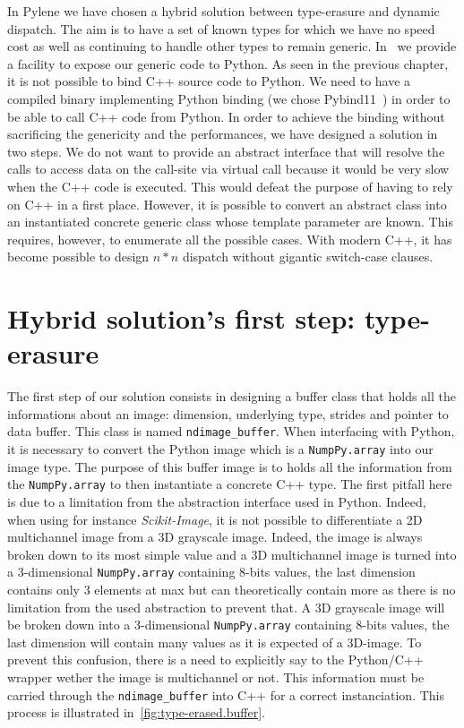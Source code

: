 In Pylene we have chosen a hybrid solution between type-erasure and dynamic dispatch. The aim is to have a set of known
types for which we have no speed cost as well as continuing to handle other types to remain generic.
In~\cite{gossec.2019.pybind} we provide a facility to expose our generic code to Python. As seen in the previous
chapter, it is not possible to bind C++ source code to Python. We need to have a compiled binary implementing Python
binding (we chose Pybind11~\parencite{jakob.2017.pybind11}) in order to be able to call C++ code from Python. In order
to achieve the binding without sacrificing the genericity and the performances, we have designed a solution in two
steps. We do not want to provide an abstract interface that will resolve the calls to access data on the call-site via
virtual call because it would be very slow when the C++ code is executed. This would defeat the purpose of having to
rely on C++ in a first place. However, it is possible to convert an abstract class into an instantiated concrete generic
class whose template parameter are known. This requires, however, to enumerate all the possible cases. With modern C++,
it has become possible to design $n*n$ dispatch without gigantic switch-case clauses.


\section{Hybrid solution's first step: type-erasure}

The first step of our solution consists in designing a buffer class that holds all the informations about an image:
dimension, underlying type, strides and pointer to data buffer. This class is named \texttt{ndimage\_buffer}. When
interfacing with Python, it is necessary to convert the Python image which is a \texttt{NumpPy.array} into our image
type. The purpose of this buffer image is to holds all the information from the \texttt{NumpPy.array} to then
instantiate a concrete C++ type. The first pitfall here is due to a limitation from the abstraction interface used in
Python. Indeed, when using for instance \emph{Scikit-Image}, it is not possible to differentiate a 2D multichannel image
from a 3D grayscale image. Indeed, the image is always broken down to its most simple value and a 3D multichannel image
is turned into a 3-dimensional \texttt{NumpPy.array} containing 8-bits values, the last dimension contains only 3
elements at max but can theoretically contain more as there is no limitation from the used abstraction to prevent that.
A 3D grayscale image will be broken down into a 3-dimensional \texttt{NumpPy.array} containing 8-bits values, the last
dimension will contain many values as it is expected of a 3D-image. To prevent this confusion, there is a need to
explicitly say to the Python/C++ wrapper wether the image is multichannel or not. This information must be carried
through the \texttt{ndimage\_buffer} into C++ for a correct instanciation. This process is illustrated
in~\cref{fig:type-erased.buffer}.

